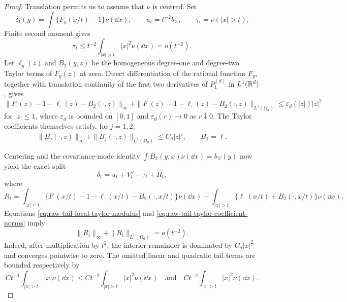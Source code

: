 \begin{proof}
Translation permits us to assume that \(\nu\) is centred.  Set
\[
 \delta_t(y)=\int\{F_y(x/t)-1\}\nu(\dd x),
 \qquad u_t=t^{-2}b_\Sigma,
 \qquad \tau_t=\nu(|x|>t).
\]
Finite second moment gives
\begin{equation}\label{eq:raw-tail-mass-smallness}
 \tau_t\le t^{-2}\int_{|x|>t}|x|^2\nu(\dd x)=o(t^{-2}).
\end{equation}
Let \(\ell_y(z)\) and \(B_2(y,z)\) be the homogeneous degree-one and
degree-two Taylor terms of \(F_y(z)\) at zero.  Direct differentiation of
the rational function \(F_y\), together with translation continuity of
the first two derivatives of \(P_1^{(d)}\) in \(L^1(\mathbb{R}^d)\), gives
\begin{equation}\label{eq:raw-tail-local-taylor-modulus}
 \|F_\cdot(z)-1-\ell_\cdot(z)-B_2(\cdot,z)\|_\infty
 +\|F_\cdot(z)-1-\ell_\cdot(z)-B_2(\cdot,z)\|_{L^1(\Omega_d)}
 \le \varepsilon_d(|z|)|z|^2
\end{equation}
for \(|z|\le1\), where \(\varepsilon_d\) is bounded on \([0,1]\) and
\(\varepsilon_d(r)\to0\) as \(r\downarrow0\).  The Taylor coefficients
themselves satisfy, for \(j=1,2\),
\begin{equation}\label{eq:raw-tail-taylor-coefficient-norms}
 \|B_j(\cdot,z)\|_\infty+
 \|B_j(\cdot,z)\|_{L^1(\Omega_d)}\le C_d|z|^j,
 \qquad B_1=\ell.
\end{equation}

Centering and the covariance-mode identity
\(\int B_2(y,x)\nu(\dd x)=b_\Sigma(y)\) now yield the exact split
\begin{equation}\label{eq:raw-tail-quotient-split}
 \delta_t=u_t+V_t^\nu-\tau_t+R_t,
\end{equation}
where
\[
 R_t=
 \int_{|x|\le t}\{F_\cdot(x/t)-1-\ell_\cdot(x/t)
                   -B_2(\cdot,x/t)\}\nu(\dd x)
 -\int_{|x|>t}\{\ell_\cdot(x/t)+B_2(\cdot,x/t)\}\nu(\dd x).
\]
Equations \eqref{eq:raw-tail-local-taylor-modulus} and
\eqref{eq:raw-tail-taylor-coefficient-norms} imply
\begin{equation}\label{eq:raw-tail-remainder-smallness}
 \|R_t\|_\infty+\|R_t\|_{L^1(\Omega_d)}=o(t^{-2}).
\end{equation}
Indeed, after multiplication by \(t^2\), the interior remainder is
dominated by \(C_d|x|^2\) and converges pointwise to zero.  The omitted
linear and quadratic tail terms are bounded respectively by
\[
 Ct^{-1}\int_{|x|>t}|x|\nu(\dd x)
 \le Ct^{-2}\int_{|x|>t}|x|^2\nu(\dd x)
 \quad\text{and}\quad
 Ct^{-2}\int_{|x|>t}|x|^2\nu(\dd x).
\]


\end{proof}
